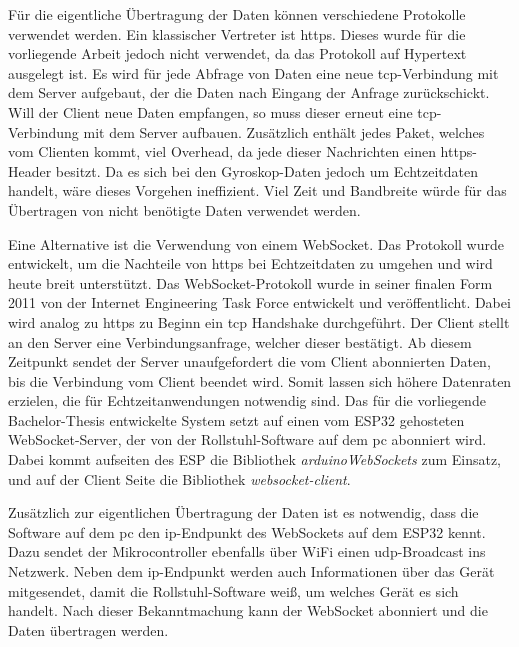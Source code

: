 Für die eigentliche Übertragung der Daten können verschiedene Protokolle verwendet werden.
Ein klassischer Vertreter ist \ac{https}.
Dieses wurde für die vorliegende Arbeit jedoch nicht verwendet, da das Protokoll auf Hypertext ausgelegt ist.
Es wird für jede Abfrage von Daten eine neue \ac{tcp}-Verbindung mit dem Server aufgebaut, der die Daten nach Eingang der Anfrage zurückschickt.
Will der Client neue Daten empfangen, so muss dieser erneut eine \ac{tcp}-Verbindung mit dem Server aufbauen\cite{ietfRFC6455WebSocket}.
Zusätzlich enthält jedes Paket, welches vom Clienten kommt, viel Overhead, da jede dieser Nachrichten einen \ac{https}-Header besitzt\cite{ietfRFC6455WebSocket}.
Da es sich bei den Gyroskop-Daten jedoch um Echtzeitdaten handelt, wäre dieses Vorgehen ineffizient.
Viel Zeit und Bandbreite würde für das Übertragen von nicht benötigte Daten verwendet werden.

Eine Alternative ist die Verwendung von einem WebSocket.
Das Protokoll wurde entwickelt, um die Nachteile von \ac{https} bei Echtzeitdaten zu umgehen und wird heute breit unterstützt.
Das WebSocket-Protokoll wurde in seiner finalen Form 2011 von der Internet Engineering Task Force entwickelt und veröffentlicht\cite{ietfRFC6455WebSocket}.
Dabei wird analog zu \ac{https} zu Beginn ein \ac{tcp} Handshake durchgeführt. Der Client stellt an den Server eine Verbindungsanfrage, welcher dieser bestätigt.
Ab diesem Zeitpunkt sendet der Server unaufgefordert die vom Client abonnierten Daten, bis die Verbindung vom Client beendet wird\cite{ietfRFC6455WebSocket}.
Somit lassen sich höhere Datenraten erzielen, die für Echtzeitanwendungen notwendig sind.
Das für die vorliegende Bachelor-Thesis entwickelte System setzt auf einen vom ESP32 gehosteten WebSocket-Server, der von der Rollstuhl-Software auf dem \ac{pc} abonniert wird.
Dabei kommt aufseiten des ESP die Bibliothek \textit{arduinoWebSockets}\cite{markusWebSocketServerClient2022} zum Einsatz, und auf der Client Seite die Bibliothek \textit{websocket-client}\cite{kotasWebsocketclient2022}.

Zusätzlich zur eigentlichen Übertragung der Daten ist es notwendig, dass die Software auf dem \ac{pc} den \ac{ip}-Endpunkt des WebSockets auf dem ESP32 kennt.
Dazu sendet der Mikrocontroller ebenfalls über WiFi einen \ac{udp}-Broadcast ins Netzwerk.
Neben dem \ac{ip}-Endpunkt werden auch Informationen über das Gerät mitgesendet, damit die Rollstuhl-Software weiß, um welches Gerät es sich handelt.
Nach dieser Bekanntmachung kann der WebSocket abonniert und die Daten übertragen werden.

